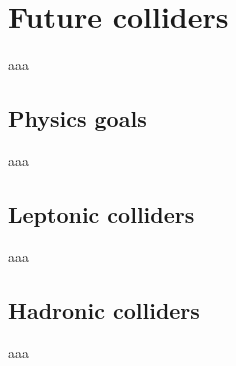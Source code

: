 \chapter{Future colliders}
aaa

\section{Physics goals}
aaa

\section{Leptonic colliders}
aaa

\section{Hadronic colliders}
aaa